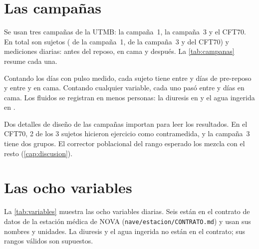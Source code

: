 \section{Las campañas}

Se usan tres campañas de la UTMB: la campaña~1, la campaña~3 y el CFT70. En total son  sujetos
( de la campaña~1,  de la campaña~3 y  del CFT70) y
 mediciones diarias:  antes del reposo,  en cama y
 después. La \cref{tab:campanas} resume cada una.

\begin{table}[htbp]
\caption[Campañas de reposo en cama]{Campañas de reposo en cama. Los días se cuentan desde el primer día en cama
(día~0); el pre-reposo es negativo. Los rangos son los que define cada protocolo.}
\label{tab:campanas}

\end{table}

Contando los días con pulso medido, cada sujeto tiene entre  y
 días de pre-reposo y entre  y
 en cama. Contando cualquier variable, cada uno pasó entre 
y  días en cama. Los fluidos se registran en menos personas: la diuresis en
 y el agua ingerida en .

Dos detalles de diseño de las campañas importan para leer los resultados. En el CFT70, 2 de los 3 sujetos hicieron
ejercicio como contramedida, y la campaña~3 tiene dos grupos. El corrector poblacional del rango esperado los mezcla
con el resto (\cref{cap:discusion}).

\section{Las ocho variables}

La \cref{tab:variables} muestra las ocho variables diarias. Seis están en el contrato de datos de la estación médica de
NOVA (\texttt{nave/estacion/CONTRATO.md}) y usan sus nombres y unidades. La diuresis y el agua ingerida no están en el
contrato; sus rangos válidos son supuestos.

\begin{table}[htbp]
\caption[Variables diarias]{Variables diarias. \enquote{Rango válido}: un valor fuera de ese rango se trata como error
de sensor y se descarta. \enquote{Ruido diario}: mediana entre personas de la desviación de cada una, que escala la
pérdida del pronóstico. \enquote{Escalón}: magnitud de la anomalía sintética que se inyecta para medir la detección.}
\label{tab:variables}
\centering\footnotesize\setlength{\tabcolsep}{4pt}

\end{table}

